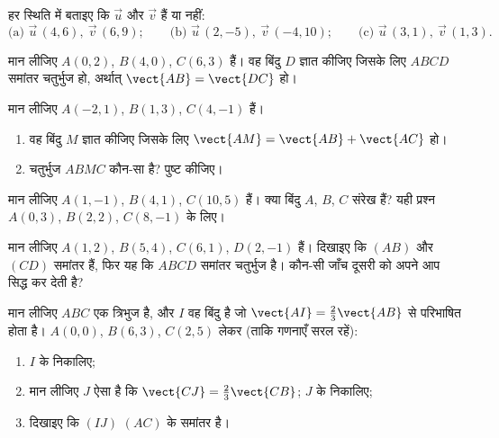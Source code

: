 \begin{exercise}[$\star$]\label{exo:g10:vectors:4}
हर स्थिति में बताइए कि $\vec u$ और $\vec v$  हैं या नहीं:
\[
\text{(a) } \vec u\,(4, 6),\ \vec v\,(6, 9);
\qquad
\text{(b) } \vec u\,(2, -5),\ \vec v\,(-4, 10);
\qquad
\text{(c) } \vec u\,(3, 1),\ \vec v\,(1, 3).
\]
\end{exercise}

\begin{exercise}[$\star$]\label{exo:g10:vectors:5}
मान लीजिए $A(0, 2)$, $B(4, 0)$, $C(6, 3)$ हैं। वह बिंदु $D$ ज्ञात कीजिए जिसके लिए
$ABCD$ समांतर चतुर्भुज हो, अर्थात् $\vect{AB} = \vect{DC}$ हो।
\end{exercise}

\begin{exercise}[$\star\star$]\label{exo:g10:vectors:6}
मान लीजिए $A(-2, 1)$, $B(1, 3)$, $C(4, -1)$ हैं।
\begin{enumerate}
  \item वह बिंदु $M$ ज्ञात कीजिए जिसके लिए $\vect{AM} = \vect{AB} + \vect{AC}$ हो।
  \item चतुर्भुज $ABMC$ कौन-सा है? पुष्ट कीजिए।
\end{enumerate}
\end{exercise}

\begin{exercise}[$\star\star$]\label{exo:g10:vectors:7}
मान लीजिए $A(1, -1)$, $B(4, 1)$, $C(10, 5)$ हैं। क्या बिंदु $A$, $B$, $C$ संरेख
हैं? यही प्रश्न $A(0, 3)$, $B(2, 2)$, $C(8, -1)$ के लिए।
\end{exercise}

\begin{exercise}[$\star\star$]\label{exo:g10:vectors:8}
मान लीजिए $A(1, 2)$, $B(5, 4)$, $C(6, 1)$, $D(2, -1)$ हैं। दिखाइए कि $(AB)$ और $(CD)$ समांतर
हैं, फिर यह कि $ABCD$ समांतर चतुर्भुज है। कौन-सी जाँच दूसरी को अपने आप सिद्ध
कर देती है?
\end{exercise}

\begin{exercise}[$\star\star$]\label{exo:g10:vectors:9}
मान लीजिए $ABC$ एक त्रिभुज है, और $I$ वह बिंदु है जो $\vect{AI} = \frac23 \vect{AB}$ से परिभाषित
होता है। $A(0,0)$, $B(6, 3)$, $C(2, 5)$ लेकर (ताकि गणनाएँ सरल रहें):
\begin{enumerate}
  \item $I$ के  निकालिए;
  \item मान लीजिए $J$ ऐसा है कि $\vect{CJ} = \frac23\vect{CB}$; $J$ के  निकालिए;
  \item दिखाइए कि $(IJ)$ $(AC)$ के समांतर है।
\end{enumerate}
\end{exercise}

